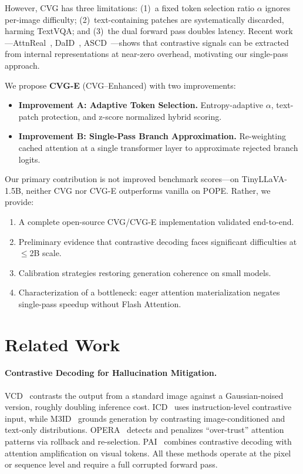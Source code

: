 \documentclass[10pt,twocolumn]{article}
\begin{document}
However, CVG has three limitations: (1)~a fixed token selection ratio $\alpha$ ignores per-image difficulty; (2)~text-containing patches are systematically discarded, harming TextVQA; and (3)~the dual forward pass doubles latency. Recent work---AttnReal~\cite{attnreal}, DaID~\cite{daid2025}, ASCD~\cite{ascd}---shows that contrastive signals can be extracted from internal representations at near-zero overhead, motivating our single-pass approach.

We propose \textbf{CVG-E} (CVG--Enhanced) with two improvements:
\begin{itemize}
\item \textbf{Improvement A: Adaptive Token Selection.} Entropy-adaptive $\alpha$, text-patch protection, and z-score normalized hybrid scoring.
\item \textbf{Improvement B: Single-Pass Branch Approximation.} Re-weighting cached attention at a single transformer layer to approximate rejected branch logits.
\end{itemize}

Our primary contribution is not improved benchmark scores---on TinyLLaVA-1.5B, neither CVG nor CVG-E outperforms vanilla on POPE. Rather, we provide:
\begin{enumerate}
\item A complete open-source CVG/CVG-E implementation validated end-to-end.
\item Preliminary evidence that contrastive decoding faces significant difficulties at $\leq$2B scale.
\item Calibration strategies restoring generation coherence on small models.
\item Characterization of a bottleneck: eager attention materialization negates single-pass speedup without Flash Attention.
\end{enumerate}

\section{Related Work}

\paragraph{Contrastive Decoding for Hallucination Mitigation.}
VCD~\cite{leng2024vcd} contrasts the output from a standard image against a Gaussian-noised version, roughly doubling inference cost. ICD~\cite{icd2024} uses instruction-level contrastive input, while M3ID~\cite{m3id2024} grounds generation by contrasting image-conditioned and text-only distributions. OPERA~\cite{opera2024} detects and penalizes ``over-trust'' attention patterns via rollback and re-selection. PAI~\cite{pai2024} combines contrastive decoding with attention amplification on visual tokens. All these methods operate at the pixel or sequence level and require a full corrupted forward pass.
\end{document}
